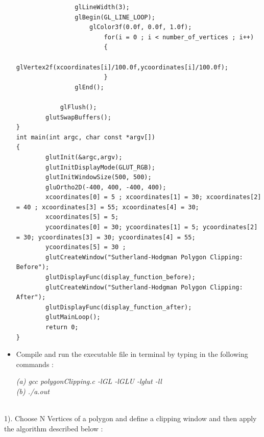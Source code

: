\begin{itemize}
\begin{lstlisting}
                glLineWidth(3);
                glBegin(GL_LINE_LOOP);
                    glColor3f(0.0f, 0.0f, 1.0f);
                        for(i = 0 ; i < number_of_vertices ; i++)
                        {
                                glVertex2f(xcoordinates[i]/100.0f,ycoordinates[i]/100.0f);
                        }
                glEnd();

            glFlush();
        glutSwapBuffers();
}
int main(int argc, char const *argv[])
{
        glutInit(&argc,argv);
        glutInitDisplayMode(GLUT_RGB);
        glutInitWindowSize(500, 500);
        gluOrtho2D(-400, 400, -400, 400);
        xcoordinates[0] = 5 ; xcoordinates[1] = 30; xcoordinates[2] = 40 ; xcoordinates[3] = 55; xcoordinates[4] = 30;
        xcoordinates[5] = 5;
        ycoordinates[0] = 30; ycoordinates[1] = 5; ycoordinates[2] = 30; ycoordinates[3] = 30; ycoordinates[4] = 55;
        ycoordinates[5] = 30 ;
        glutCreateWindow("Sutherland-Hodgman Polygon Clipping: Before");
        glutDisplayFunc(display_function_before);
        glutCreateWindow("Sutherland-Hodgman Polygon Clipping: After");
        glutDisplayFunc(display_function_after);
        glutMainLoop();
        return 0;
}
\end{lstlisting}

\vspace{0.5mm}

\item Compile and run the executable file in terminal by typing in the following commands : \\

\vspace{0.5mm} \flushleft

\textit{(a)\hspace{2mm} gcc polygonClipping.c -lGL -lGLU -lglut -ll} \\
\textit{(b)\hspace{2mm} ./a.out}
\vspace*{1\baselineskip}
\end{itemize}

\\

1). Choose N Vertices of a polygon and define a clipping window and then apply the algorithm described below :

